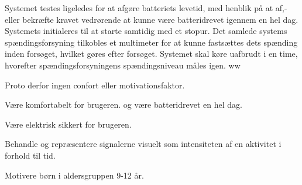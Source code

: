 Systemet testes ligeledes for at afgøre batteriets levetid, med henblik på at af,- eller bekræfte kravet vedrørende at kunne være batteridrevet igennem en hel dag. Systemets initialeres til at starte samtidig med et stopur. Det samlede systems spændingsforsyning tilkobles et multimeter for at kunne fastsættes dets spænding inden forsøget, hvilket gøres efter forsøget. Systemet skal køre uafbrudt i en time, hvorefter spændingsforsyningens spændingsniveau måles igen. 
ww 

Proto derfor ingen confort eller motivationsfaktor.

	\item Være komfortabelt for brugeren.
og være batteridrevet en hel dag.
	\item Være elektrisk sikkert for brugeren.
	\item Behandle og repræsentere signalerne visuelt som intensiteten af en aktivitet i forhold til tid.
	\item Motivere børn i aldersgruppen 9-12 år. 




